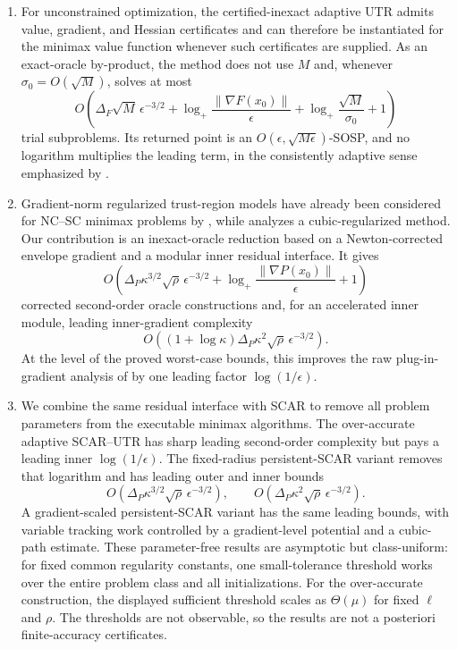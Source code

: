 \documentclass{article}
\begin{document}
\begin{enumerate}[label=(\roman*)]
 \item For unconstrained optimization, the certified-inexact adaptive
 UTR admits value, gradient, and Hessian certificates and can therefore
 be instantiated for the minimax value function whenever such
 certificates are supplied.  As an exact-oracle by-product, the method
 does not use $M$ and, whenever
 $\sigma_0=O(\sqrt M)$, solves at most
 \[
 O\!\left(\Delta_F\sqrt M\,\epsilon^{-3/2}
 +\log_+\!\frac{\|\nabla F(x_0)\|}{\epsilon}
 +\log_+\!\frac{\sqrt M}{\sigma_0}+1\right)
 \]
 trial subproblems.  Its returned point is an
 $O(\epsilon,\sqrt{M\epsilon})$-SOSP, and no logarithm multiplies the
 leading term, in the consistently adaptive sense emphasized by
 \citet{hamad2022consistently,fang2026parameter}.

 \item Gradient-norm regularized trust-region models have already
 been considered for NC--SC minimax problems by
 \citet{wang2025gradient}, while \citet{luo2022finding} analyzes a
 cubic-regularized method.  Our contribution is an inexact-oracle
 reduction based on a Newton-corrected envelope gradient and a modular
 inner residual interface.  It gives
 \[
 O\!\left(\Delta_P\kappa^{3/2}\sqrt\rho\,\epsilon^{-3/2}
 +\log_+\!\frac{\|\nabla P(x_0)\|}{\epsilon}+1\right)
 \]
 corrected second-order oracle constructions and, for an accelerated
 inner module, leading inner-gradient complexity
 \[
 O\!\left((1+\log\kappa)\Delta_P\kappa^2\sqrt\rho\,
 \epsilon^{-3/2}\right).
 \]
 At the level of the proved worst-case bounds, this improves the raw
 plug-in-gradient analysis of \citet{luo2022finding} by one leading
 factor $\log(1/\epsilon)$.

 \item We combine the same residual interface with SCAR to remove all
 problem parameters from the executable minimax algorithms.  The
 over-accurate adaptive SCAR--UTR has sharp leading second-order
 complexity but pays a leading inner $\log(1/\epsilon)$.  The
 fixed-radius persistent-SCAR variant removes that logarithm and has
 leading outer and inner bounds
 \[
 O(\Delta_P\kappa^{3/2}\sqrt\rho\,\epsilon^{-3/2}),
 \qquad
 O(\Delta_P\kappa^2\sqrt\rho\,\epsilon^{-3/2}).
 \]
 A gradient-scaled persistent-SCAR variant has the same leading bounds,
 with variable tracking work controlled by a gradient-level potential
 and a cubic-path estimate.
 These parameter-free results are asymptotic but class-uniform: for
 fixed common regularity constants, one small-tolerance threshold works
 over the entire problem class and all initializations.  For the
 over-accurate construction, the displayed sufficient threshold scales
 as $\Theta(\mu)$ for fixed $\ell$ and $\rho$.  The thresholds are not
 observable, so the results are not a posteriori finite-accuracy
 certificates.
\end{enumerate}
\end{document}

